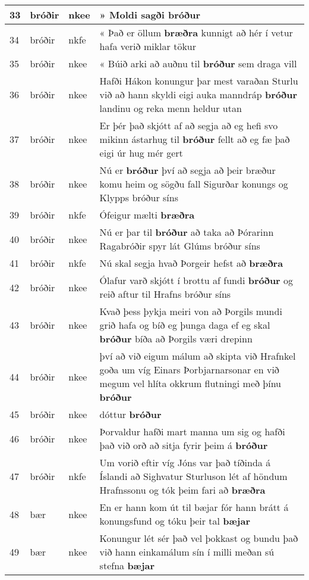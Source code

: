 \documentclass{article}
\begin{document}
\begin{longtable}{p{1cm}|p{1cm}|p{1cm}|p{13cm}}
\hline
33&bróðir&nkee&» Moldi sagði \textbf{bróður} \\
\hline
34&bróðir&nkfe&« Það er öllum \textbf{bræðra} kunnigt að hér í vetur hafa verið miklar tökur\\
\hline
35&bróðir&nkee&« Búið arki að auðnu til \textbf{bróður} sem draga vill\\
\hline
36&bróðir&nkee&Hafði Hákon konungur þar mest varaðan Sturlu við að hann skyldi eigi auka manndráp \textbf{bróður} landinu og reka menn heldur utan\\
\hline
37&bróðir&nkee&Er þér það skjótt af að segja að eg hefi svo mikinn ástarhug til \textbf{bróður} fellt að eg fæ það eigi úr hug mér gert\\
\hline
38&bróðir&nkee&Nú er \textbf{bróður} því að segja að þeir bræður komu heim og sögðu fall Sigurðar konungs og Klypps bróður síns\\
\hline
39&bróðir&nkfe&Ófeigur mælti \textbf{bræðra} \\
\hline
40&bróðir&nkee&Nú er þar til \textbf{bróður} að taka að Þórarinn Ragabróðir spyr lát Glúms bróður síns\\
\hline
41&bróðir&nkfe&Nú skal segja hvað Þorgeir hefst að \textbf{bræðra} \\
\hline
42&bróðir&nkee&Ólafur varð skjótt í brottu af fundi \textbf{bróður} og reið aftur til Hrafns bróður síns\\
\hline
43&bróðir&nkee&Kvað þess þykja meiri von að Þorgils mundi grið hafa og bíð eg þunga daga ef eg skal \textbf{bróður} bíða að Þorgils væri drepinn\\
\hline
44&bróðir&nkee&því að við eigum málum að skipta við Hrafnkel goða um víg Einars Þorbjarnarsonar en við megum vel hlíta okkrum flutningi með þínu \textbf{bróður} \\
\hline
45&bróðir&nkee&dóttur \textbf{bróður} \\
\hline
46&bróðir&nkee&Þorvaldur hafði mart manna um sig og hafði það við orð að sitja fyrir þeim á \textbf{bróður} \\
\hline
47&bróðir&nkfe&Um vorið eftir víg Jóns var það tíðinda á Íslandi að Sighvatur Sturluson lét af höndum Hrafnssonu og tók þeim fari að \textbf{bræðra} \\
\hline
48&bær&nkee&En er hann kom út til bæjar fór hann brátt á konungsfund og tóku þeir tal \textbf{bæjar} \\
\hline
49&bær&nkee&Konungur lét sér það vel þokkast og bundu það við hann einkamálum sín í milli meðan sú stefna \textbf{bæjar} \\

\end{longtable}
\end{document}
